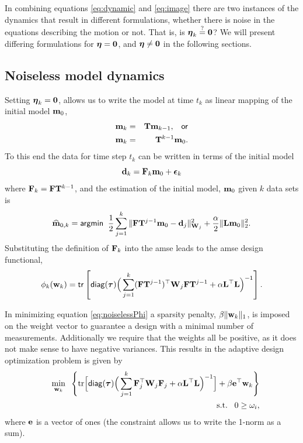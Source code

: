 \documentclass[english]{siamltex}
\newcommand{\bfF}	{{\bf{F}}}
\newcommand{\bfL}	{{\bf{L}}}
\newcommand{\bfT}	{{\bf{T}}}
\newcommand{\bfW}	{{\bf{W}}}
\newcommand{\bfd}	{{\bf{d}}}
\newcommand{\bfe}	{{\bf{e}}}
\newcommand{\bfm}	{{\bf{m}}}
\newcommand{\bfw}	{{\bf{w}}}
\newcommand{\hf}        {{\frac 12}}
\newcommand{\bfepsilon} {{\boldsymbol \epsilon}}
\newcommand{\bfeta}     {{\boldsymbol \eta}}
\newcommand{\bftau}      {{\boldsymbol \tau}}
\newcommand{\bfmhat}    {{\widehat{\bfm}}}
\newcommand{\LtL}       { \bfL^{\top}\bfL}
\newcommand {\zero}  { {\bf 0} }
\renewcommand{\hf}		 {\frac12}
\renewcommand{\bfmhat}	{\widehat{\bf m}}
\begin{document}
{In combining equations \eqref{eq:dynamic} and \eqref{eq:image}  there are two instances of the dynamics that result in different formulations, whether there is noise in the equations describing the motion or not. That is, is $\bfeta_k \overset{?}{=} \zero$? We will present differing formulations  for $\bfeta = \zero$, and $\bfeta \neq \zero$ in the following sections.

\subsection{Noiseless model dynamics}
Setting $\bfeta_k = \zero$, allows us to write the model at time $t_k$ as linear mapping of the initial model $\bfm_0$, 
\begin{eqnarray*}
\bfm_{k} &=& \bfT\bfm_{k-1}, \;\;\;{\sf or } \\
\bfm_{k} &=& \bfT^{k-1}\bfm_0.
\end{eqnarray*} 
To this end the data for time step $t_k$ can be written in terms of the initial model 
\begin{equation}
\bfd_k = \bfF_k\bfm_0 + \bfepsilon_k
\end{equation}
where $\bfF_k = \bfF\bfT^{k-1}$, and the estimation of the initial model, $\bfm_0$ given $k$ data sets is 
\begin{equation}
\bfmhat_{0,k} ={\sf argmin } \;\; \hf  \sum_{j=1}^{k}\| \bfF\bfT^{j-1}\bfm_0 - \bfd_j \|_{\bfW_j}^2 + \frac{\alpha}{2}\|\bfL\bfm_0\|_2^2.
\end{equation}
Substituting the definition of $\bfF_k$ into the {\sf amse} leads to the {\sf amse} design functional,
\begin{equation}
\label{eq:noiselessPhi}
\phi_{k}(\bfw_{k}) = {\sf tr} \left[  {\sf diag}(\bftau) \Big(\sum_{j=1}^{k}(\bfF\bfT^{j-1})^{\top}\bfW_{j}\bfF\bfT^{j-1}   +
\alpha \LtL \Big)^{-1} \right] .
\end{equation}

In minimizing equation \eqref{eq:noiselessPhi} a sparsity penalty, $\beta\|\bfw_k\|_1$, is imposed on the weight vector to guarantee a design with a minimal number of measurements. Additionally we require that the weights all be positive, as it does not make sense to have negative variances. This results in the adaptive design optimization problem is given by 
\begin{eqnarray}
\label{eq:noiselessOpt}
\nonumber
 &&\min_{\bfw_k}\;\;\Bigg \{\text{tr}\Big[ {\sf diag}(\bftau) \Big(\sum_{j=1}^{k}\bfF_{j}^{\top}\bfW_{j}\bfF_{j}   +
\alpha \LtL\Big)^{-1}\Big] + \beta \bfe^{\top}\bfw_k \Bigg \}\\
 &&\text{ s.t.} \;\;\;0 \geq \omega_i,
\end{eqnarray}
where $\bfe$ is a vector of ones (the constraint allows us to write the 1-norm as a sum). 

}
\end{document}
